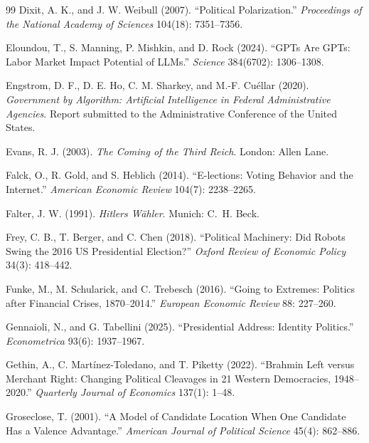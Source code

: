 \documentclass[12pt,letterpaper]{article}
\begin{document}
\begin{thebibliography}{99}
Dixit, A. K., and J. W. Weibull (2007). ``Political Polarization.'' \textit{Proceedings of the National Academy of Sciences} 104(18): 7351--7356.

Eloundou, T., S. Manning, P. Mishkin, and D. Rock (2024). ``GPTs Are GPTs: Labor Market Impact Potential of LLMs.'' \textit{Science} 384(6702): 1306--1308.

Engstrom, D. F., D. E. Ho, C. M. Sharkey, and M.-F. Cu\'{e}llar (2020). \textit{Government by Algorithm: Artificial Intelligence in Federal Administrative Agencies}. Report submitted to the Administrative Conference of the United States.

Evans, R. J. (2003). \textit{The Coming of the Third Reich}. London: Allen Lane.

Falck, O., R. Gold, and S. Heblich (2014). ``E-lections: Voting Behavior and the Internet.'' \textit{American Economic Review} 104(7): 2238--2265.

Falter, J. W. (1991). \textit{Hitlers W\"{a}hler}. Munich: C.~H. Beck.

Frey, C. B., T. Berger, and C. Chen (2018). ``Political Machinery: Did Robots Swing the 2016 US Presidential Election?'' \textit{Oxford Review of Economic Policy} 34(3): 418--442.

Funke, M., M. Schularick, and C. Trebesch (2016). ``Going to Extremes: Politics after Financial Crises, 1870--2014.'' \textit{European Economic Review} 88: 227--260.

Gennaioli, N., and G. Tabellini (2025). ``Presidential Address: Identity Politics.'' \textit{Econometrica} 93(6): 1937--1967.

Gethin, A., C. Mart\'{i}nez-Toledano, and T. Piketty (2022). ``Brahmin Left versus Merchant Right: Changing Political Cleavages in 21 Western Democracies, 1948--2020.'' \textit{Quarterly Journal of Economics} 137(1): 1--48.

Groseclose, T. (2001). ``A Model of Candidate Location When One Candidate Has a Valence Advantage.'' \textit{American Journal of Political Science} 45(4): 862--886.


\end{thebibliography}
\end{document}

